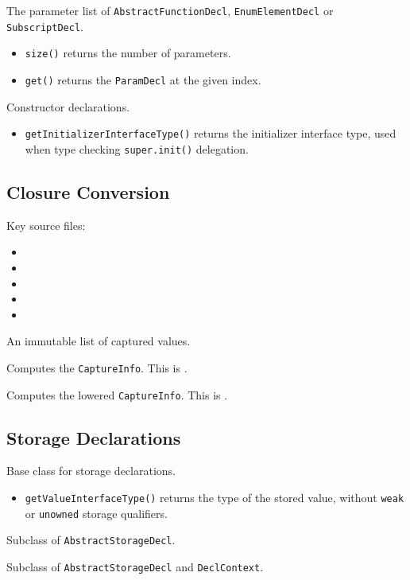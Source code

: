 \documentclass[../generics]{subfiles}
\begin{document}
The parameter list of \texttt{AbstractFunctionDecl}, \texttt{EnumElementDecl} or \texttt{SubscriptDecl}.
\begin{itemize}
\item \texttt{size()} returns the number of parameters.
\item \texttt{get()} returns the \texttt{ParamDecl} at the given index.
\end{itemize}

Constructor declarations.
\begin{itemize}
\item \texttt{getInitializerInterfaceType()} returns the initializer interface type, used when type checking \texttt{super.init()} delegation.
\end{itemize}

\subsection*{Closure Conversion}

Key source files:
\begin{itemize}
\item {}
\item {}
\item {}
\item {}
\item {}
\end{itemize}

An immutable list of captured values.

Computes the \texttt{CaptureInfo}. This is .

Computes the lowered \texttt{CaptureInfo}. This is .

\subsection*{Storage Declarations}

Base class for storage declarations.
\begin{itemize}
\item \texttt{getValueInterfaceType()} returns the type of the stored value, without \texttt{weak} or \texttt{unowned} storage qualifiers.
\end{itemize}

Subclass of \texttt{AbstractStorageDecl}.

Subclass of \texttt{AbstractStorageDecl} and \texttt{DeclContext}.
\end{document}
